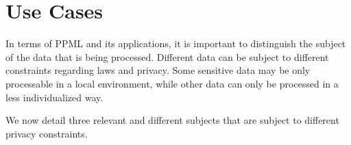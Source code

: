 
\section{Use Cases}
\label{sec:UseCases}


In terms of \ac{PPML} and its applications, it is important to distinguish the subject of the data that is being processed. Different data can be subject to different constraints regarding laws and privacy. Some sensitive data may be only processable in a local environment, while other data can only be processed in a less individualized way.

We now detail three relevant and different subjects that are subject to different privacy constraints.

